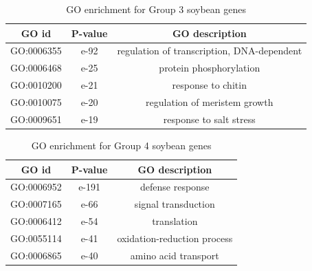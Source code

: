 \documentclass{article}
\begin{document}
		\begin{table}[h!]
			\centering
			\begin{tabular}{|c |c |c |} 
				\hline
				GO id & P-value & GO description \\
				\hline\hline
				GO:0006355 & e-92 & regulation of transcription, DNA-dependent \\ 
				\hline
				GO:0006468 & e-25 & protein phosphorylation \\
				\hline
				GO:0010200 & e-21 & response to chitin \\
				\hline
				GO:0010075 & e-20 & regulation of meristem growth \\
				\hline
				GO:0009651 & e-19 & response to salt stress \\ 
				\hline
			\end{tabular}
			\caption{GO enrichment for Group 3 soybean genes}
			\label{tab:gotable_group3}
		\end{table}
		
		\begin{table}[h!]
			\centering
			\begin{tabular}{|c |c |c |} 
				\hline
				GO id & P-value & GO description \\
				\hline\hline
				GO:0006952 & e-191 & defense response \\ 
				\hline
				GO:0007165 & e-66 & signal transduction \\
				\hline
				GO:0006412 & e-54 & translation \\
				\hline
				GO:0055114 & e-41 & oxidation-reduction process \\
				\hline
				GO:0006865 & e-40 & amino acid transport \\ 
				\hline
			\end{tabular}
			\caption{GO enrichment for Group 4 soybean genes}
			\label{tab:gotable_group4}
		\end{table}

	\pagebreak
\end{document}
